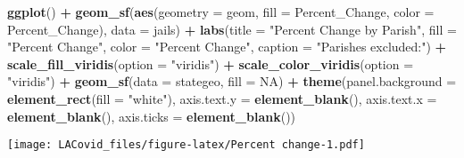 \documentclass[
]{article}
\newenvironment{Shaded}{\begin{snugshade}}{\end{snugshade}}
\newcommand{\DataTypeTok}[1]{\textcolor[rgb]{0.13,0.29,0.53}{#1}}
\newcommand{\KeywordTok}[1]{\textcolor[rgb]{0.13,0.29,0.53}{\textbf{#1}}}
\newcommand{\NormalTok}[1]{#1}
\newcommand{\OperatorTok}[1]{\textcolor[rgb]{0.81,0.36,0.00}{\textbf{#1}}}
\newcommand{\OtherTok}[1]{\textcolor[rgb]{0.56,0.35,0.01}{#1}}
\newcommand{\StringTok}[1]{\textcolor[rgb]{0.31,0.60,0.02}{#1}}
\begin{document}
\begin{Shaded}
\begin{Highlighting}[]
\KeywordTok{ggplot}\NormalTok{() }\OperatorTok{+}
\StringTok{  }\KeywordTok{geom_sf}\NormalTok{(}\KeywordTok{aes}\NormalTok{(}\DataTypeTok{geometry =}\NormalTok{ geom, }\DataTypeTok{fill =}\NormalTok{ Percent_Change, }\DataTypeTok{color =}\NormalTok{ Percent_Change), }\DataTypeTok{data =}\NormalTok{ jails) }\OperatorTok{+}
\StringTok{  }\KeywordTok{labs}\NormalTok{(}\DataTypeTok{title =} \StringTok{"Percent Change by Parish"}\NormalTok{,}
       \DataTypeTok{fill =} \StringTok{"Percent Change"}\NormalTok{,}
       \DataTypeTok{color =} \StringTok{"Percent Change"}\NormalTok{,}
       \DataTypeTok{caption =} \StringTok{"Parishes excluded:"}\NormalTok{) }\OperatorTok{+}\StringTok{ }
\StringTok{  }\KeywordTok{scale_fill_viridis}\NormalTok{(}\DataTypeTok{option =} \StringTok{"viridis"}\NormalTok{) }\OperatorTok{+}\StringTok{ }
\StringTok{  }\KeywordTok{scale_color_viridis}\NormalTok{(}\DataTypeTok{option =} \StringTok{"viridis"}\NormalTok{) }\OperatorTok{+}
\StringTok{  }\KeywordTok{geom_sf}\NormalTok{(}\DataTypeTok{data =}\NormalTok{ stategeo, }\DataTypeTok{fill =} \OtherTok{NA}\NormalTok{) }\OperatorTok{+}
\StringTok{  }\KeywordTok{theme}\NormalTok{(}\DataTypeTok{panel.background =} \KeywordTok{element_rect}\NormalTok{(}\DataTypeTok{fill =} \StringTok{"white"}\NormalTok{),}
        \DataTypeTok{axis.text.y =} \KeywordTok{element_blank}\NormalTok{(),}
        \DataTypeTok{axis.text.x =} \KeywordTok{element_blank}\NormalTok{(),}
        \DataTypeTok{axis.ticks =} \KeywordTok{element_blank}\NormalTok{()) }
\end{Highlighting}
\end{Shaded}

\texttt{[image: LACovid\_files/figure-latex/Percent change-1.pdf]}
\end{document}
